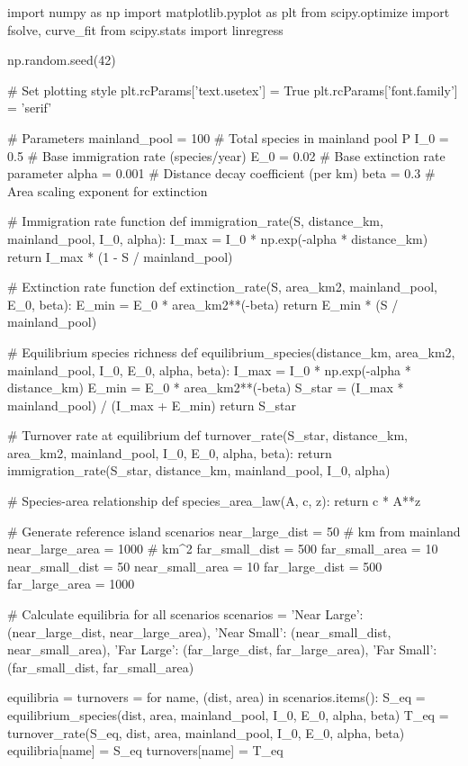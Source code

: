 \documentclass[a4paper, 11pt]{article}
\begin{document}
\begin{pycode}
import numpy as np
import matplotlib.pyplot as plt
from scipy.optimize import fsolve, curve_fit
from scipy.stats import linregress

np.random.seed(42)

# Set plotting style
plt.rcParams['text.usetex'] = True
plt.rcParams['font.family'] = 'serif'

# Parameters
mainland_pool = 100  # Total species in mainland pool P
I_0 = 0.5           # Base immigration rate (species/year)
E_0 = 0.02          # Base extinction rate parameter
alpha = 0.001       # Distance decay coefficient (per km)
beta = 0.3          # Area scaling exponent for extinction

# Immigration rate function
def immigration_rate(S, distance_km, mainland_pool, I_0, alpha):
    I_max = I_0 * np.exp(-alpha * distance_km)
    return I_max * (1 - S / mainland_pool)

# Extinction rate function
def extinction_rate(S, area_km2, mainland_pool, E_0, beta):
    E_min = E_0 * area_km2**(-beta)
    return E_min * (S / mainland_pool)

# Equilibrium species richness
def equilibrium_species(distance_km, area_km2, mainland_pool, I_0, E_0, alpha, beta):
    I_max = I_0 * np.exp(-alpha * distance_km)
    E_min = E_0 * area_km2**(-beta)
    S_star = (I_max * mainland_pool) / (I_max + E_min)
    return S_star

# Turnover rate at equilibrium
def turnover_rate(S_star, distance_km, area_km2, mainland_pool, I_0, E_0, alpha, beta):
    return immigration_rate(S_star, distance_km, mainland_pool, I_0, alpha)

# Species-area relationship
def species_area_law(A, c, z):
    return c * A**z

# Generate reference island scenarios
near_large_dist = 50    # km from mainland
near_large_area = 1000  # km^2
far_small_dist = 500
far_small_area = 10
near_small_dist = 50
near_small_area = 10
far_large_dist = 500
far_large_area = 1000

# Calculate equilibria for all scenarios
scenarios = {
    'Near Large': (near_large_dist, near_large_area),
    'Near Small': (near_small_dist, near_small_area),
    'Far Large': (far_large_dist, far_large_area),
    'Far Small': (far_small_dist, far_small_area)
}

equilibria = {}
turnovers = {}
for name, (dist, area) in scenarios.items():
    S_eq = equilibrium_species(dist, area, mainland_pool, I_0, E_0, alpha, beta)
    T_eq = turnover_rate(S_eq, dist, area, mainland_pool, I_0, E_0, alpha, beta)
    equilibria[name] = S_eq
    turnovers[name] = T_eq


\end{pycode}
\end{document}
